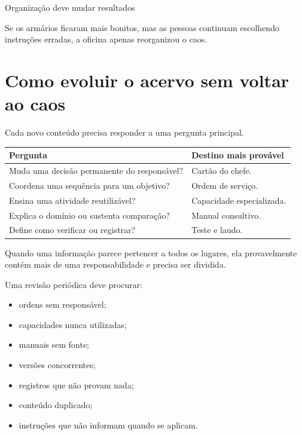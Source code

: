 \documentclass[
  10pt,
  a4paper,
  oneside]{book}
\providecommand{\tightlist}{%
  \setlength{\itemsep}{0pt}\setlength{\parskip}{0pt}}
\begin{document}
\begin{evidencebox}{Organização deve mudar resultados}

Se os armários ficaram mais bonitos, mas as pessoas continuam escolhendo
instruções erradas, a oficina apenas reorganizou o caos.

\end{evidencebox}

\hypertarget{como-evoluir-o-acervo-sem-voltar-ao-caos}{%
\section{Como evoluir o acervo sem voltar ao
caos}\label{como-evoluir-o-acervo-sem-voltar-ao-caos}}

Cada novo conteúdo precisa responder a uma pergunta principal.

\begin{longtable}[]{@{}ll@{}}
\toprule\noalign{}
Pergunta & Destino mais provável \\
\midrule\noalign{}
\endhead
\bottomrule\noalign{}
\endlastfoot
Muda uma decisão permanente do responsável? & Cartão do chefe. \\
Coordena uma sequência para um objetivo? & Ordem de serviço. \\
Ensina uma atividade reutilizável? & Capacidade especializada. \\
Explica o domínio ou sustenta comparação? & Manual consultivo. \\
Define como verificar ou registrar? & Teste e laudo. \\
\end{longtable}

Quando uma informação parece pertencer a todos os lugares, ela
provavelmente contém mais de uma responsabilidade e precisa ser
dividida.

Uma revisão periódica deve procurar:

\begin{itemize}
\tightlist
\item
  ordens sem responsável;
\item
  capacidades nunca utilizadas;
\item
  manuais sem fonte;
\item
  versões concorrentes;
\item
  registros que não provam nada;
\item
  conteúdo duplicado;
\item
  instruções que não informam quando se aplicam.
\end{itemize}
\end{document}
